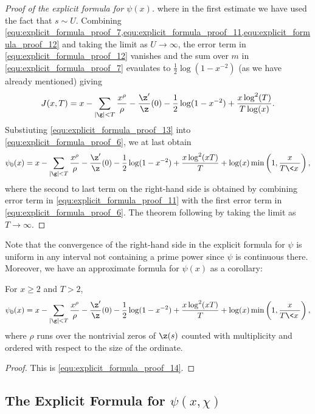 \begin{proof}[Proof of the explicit formula for $\psi(x)$]
        where in the first estimate we have used the fact that $s \sim U$. Combining \cref{equ:explicit_formula_proof_7,equ:explicit_formula_proof_11,equ:explicit_formula_proof_12} and taking the limit as $U \to \infty$, the error term in \cref{equ:explicit_formula_proof_12} vanishes and the sum over $m$ in \cref{equ:explicit_formula_proof_7} evaulates to $\frac{1}{2}\log(1-x^{-2})$ (as we have already mentioned) giving
        \begin{equation}\label{equ:explicit_formula_proof_13}
          J(x,T) = x-\sum_{|\g| < T}\frac{x^{\rho}}{\rho}-\frac{\z'}{\z}(0)-\frac{1}{2}\log(1-x^{-2})+\frac{x\log^{2}(T)}{T\log(x)}.
        \end{equation}
        Substiuting \cref{equ:explicit_formula_proof_13} into \cref{equ:explicit_formula_proof_6}, we at last obtain
        \begin{equation}\label{equ:explicit_formula_proof_14}
          \psi_{0}(x) = x-\sum_{|\g| < T}\frac{x^{\rho}}{\rho}-\frac{\z'}{\z}(0)-\frac{1}{2}\log(1-x^{-2})+\frac{x\log^{2}(xT)}{T}+\log(x)\min\left(1,\frac{x}{T\<x\>}\right),
        \end{equation}
        where the second to last term on the right-hand side is obtained by combining error term in \cref{equ:explicit_formula_proof_11} with the first error term in \cref{equ:explicit_formula_proof_6}. The theorem following by taking the limit as $T \to \infty$.
      \end{proof}

      Note that the convergence of the right-hand side in the explicit formula for $\psi$ is uniform in any interval not containing a prime power since $\psi$ is continuous there. Moreover, we have an approximate formula for $\psi(x)$ as a corollary:

      \begin{corollary}\label{cor:explicit_formula_zeta_corollary}
         For $x \ge 2$ and $T > 2$,
        \[
           \psi_{0}(x) = x-\sum_{|\g| < T}\frac{x^{\rho}}{\rho}-\frac{\z'}{\z}(0)-\frac{1}{2}\log(1-x^{-2})+\frac{x\log^{2}(xT)}{T}+\log(x)\min\left(1,\frac{x}{T\<x\>}\right),
        \]
        where $\rho$ runs over the nontrivial zeros of $\z(s)$ counted with multiplicity and ordered with respect to the size of the ordinate.
      \end{corollary}
      \begin{proof}
        This is \cref{equ:explicit_formula_proof_14}.
      \end{proof}
    \subsection*{The Explicit Formula for \texorpdfstring{$\psi(x,\chi)$}{$\psi(x,\chi)$}}
